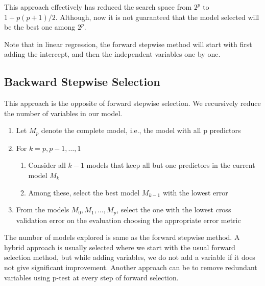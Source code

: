 \documentclass[../statistical_learning_notes.tex]{subfiles}
\begin{document}
    This approach effectively has reduced the search space from $2^{p}$ to $1 + p(p+1)/2$. Although, now it is not guaranteed that the model selected will be the best one among $2^{p}$.\newline

    Note that in linear regression, the forward stepwise method will start with first adding the intercept, and then the independent variables one by one.


    \subsection{Backward Stepwise Selection}
    This approach is the opposite of forward stepwise selection. We recursively reduce the number of variables in our model.

    \begin{enumerate}
        \item Let $M_{p}$ denote the complete model, i.e., the model with all p predictors
        \item For $k = p, p-1, \ldots, 1$
        \begin{enumerate}
            \item Consider all $k-1$ models that keep all but one predictors in the current model $M_{k}$
            \item Among these, select the best model $M_{k-1}$ with the lowest error
        \end{enumerate}
        \item From the models $M_{0}, M_{1}, \ldots, M_{p}$, select the one with the lowest cross validation error on the evaluation choosing the appropriate error metric 
    \end{enumerate}

    The number of models explored is same as the forward stepwise method.\newline
    A hybrid approach is usually selected where we start with the usual forward selection method, but while adding variables, we do not add a variable if it does not give significant improvement. Another approach can be to remove redundant variables using p-test at every step of forward selection.

    
\end{document}
